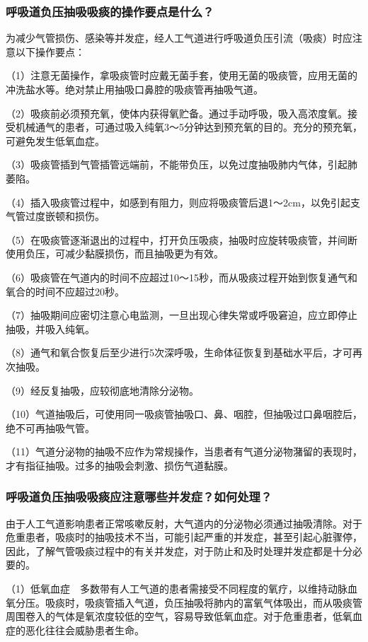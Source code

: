 \subsubsection{呼吸道负压抽吸吸痰的操作要点是什么？}

为减少气管损伤、感染等并发症，经人工气道进行呼吸道负压引流（吸痰）时应注意以下操作要点：

（1）注意无菌操作，拿吸痰管时应戴无菌手套，使用无菌的吸痰管，应用无菌的冲洗盐水等。绝对禁止用抽吸口鼻腔的吸痰管再抽吸气道。

（2）吸痰前必须预充氧，使体内获得氧贮备。通过手动呼吸，吸入高浓度氧。接受机械通气的患者，可通过吸入纯氧3～5分钟达到预充氧的目的。充分的预充氧，可避免发生低氧血症。

（3）吸痰管插到气管插管远端前，不能带负压，以免过度抽吸肺内气体，引起肺萎陷。

（4）插入吸痰管过程中，如感到有阻力，则应将吸痰管后退1～2cm，以免引起支气管过度嵌顿和损伤。

（5）在吸痰管逐渐退出的过程中，打开负压吸痰，抽吸时应旋转吸痰管，并间断使用负压，可减少黏膜损伤，而且抽吸更为有效。

（6）吸痰管在气道内的时间不应超过10～15秒，而从吸痰过程开始到恢复通气和氧合的时间不应超过20秒。

（7）抽吸期间应密切注意心电监测，一旦出现心律失常或呼吸窘迫，应立即停止抽吸，并吸入纯氧。

（8）通气和氧合恢复后至少进行5次深呼吸，生命体征恢复到基础水平后，才可再次抽吸。

（9）经反复抽吸，应较彻底地清除分泌物。

（10）气道抽吸后，可使用同一吸痰管抽吸口、鼻、咽腔，但抽吸过口鼻咽腔后，绝不可再抽吸气管。

（11）气道分泌物的抽吸不应作为常规操作，当患者有气道分泌物潴留的表现时，才有指征抽吸。过多的抽吸会刺激、损伤气道黏膜。

\subsubsection{呼吸道负压抽吸吸痰应注意哪些并发症？如何处理？}

由于人工气道影响患者正常咳嗽反射，大气道内的分泌物必须通过抽吸清除。对于危重患者，吸痰时的抽吸技术不当，可能引起严重的并发症，甚至引起心脏骤停，因此，了解气管吸痰过程中的有关并发症，对于防止和及时处理并发症都是十分必要的。

（1）低氧血症　多数带有人工气道的患者需接受不同程度的氧疗，以维持动脉血氧分压。吸痰时，吸痰管插入气道，负压抽吸将肺内的富氧气体吸出，而从吸痰管周围卷入的气体是氧浓度较低的空气，容易导致低氧血症。对于危重患者，低氧血症的恶化往往会威胁患者生命。

